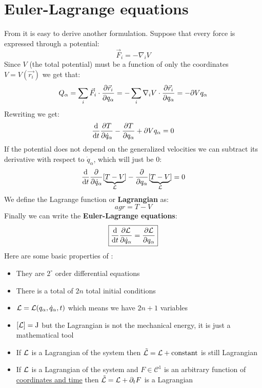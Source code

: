 \section{Euler-Lagrange equations}
From \lagrangeref\;it is easy to derive another formulation. Suppose that every force is expressed through a potential:
\begin{equation}
    \vec{F}_i = -\nabla_i V
\end{equation}
Since $V$ (the total potential) must be a function of only the coordinates $V = V(\vec{r_i})$ we get that:
\begin{equation}
    Q_{\alpha} = \displaystyle\sum_i \vec{F}_i \cdot \dfrac{\partial \vec{r}_i}{\partial q_{\alpha}} = - \displaystyle\sum_i \nabla_i V \cdot \dfrac{\partial \vec{r}_i}{\partial q_{\alpha}} = -\partial{V}{q_{\alpha}}
\end{equation}
Rewriting \lagrangeref\;we get:
\begin{equation}
    \dfrac{\mathrm{d} }{\mathrm{d}t}\dfrac{\partial T}{\partial \dot{q}_{\alpha}} - \dfrac{\partial T}{\partial q_{\alpha}} + \partial{V}{q_{\alpha}} = 0
\end{equation}
If the potential does not depend on the generalized velocities we can subtract its derivative with respect to $\dot{q}_{\alpha}$, which will just be 0:
\begin{equation}
    \dfrac{\mathrm{d} }{\mathrm{d}t}\dfrac{\partial }{\partial \dot{q}_{\alpha}}[\underbrace{T-V}_{\mathcal{L}} ] - \dfrac{\partial}{\partial q_{\alpha}}[\underbrace{T-V}_{\mathcal{L}} ] = 0
\end{equation}
We define the Lagrange function or \textbf{Lagrangian} as:
\begin{equation}
    agr  = T - V
\end{equation}
Finally we can write the \textbf{Euler-Lagrange equations}:
\begin{equation} \label{Euler_Lagrange_equations}
    \boxed{\dfrac{\mathrm{d} }{\mathrm{d}t}\dfrac{\partial \mathcal{L}}{\partial \dot{q}_{\alpha}} = \dfrac{\partial \mathcal{L}}{\partial q_{\alpha}}}
\end{equation}
Here are some basic properties of \eleref :
\begin{itemize}
    \item They are $2^\circ$ order differential equations
    \item There is a total of $2n$ total initial conditions
    \item $\mathcal{L} = \mathcal{L}(q_{\alpha},\dot{q}_{\alpha},t)$ which means we have $2n+1$ variables
    \item $[\mathcal{L}] = \mathrm{J}$ but the Lagrangian is not the mechanical energy, it is just a mathematical tool
    \item If $\mathcal{L}$ is a Lagrangian of the system then $\tilde{\mathcal{L}} = \mathcal{L} + \mathrm{constant}$ is still Lagrangian
    \item If $\mathcal{L}$ is a Lagrangian of the system and $F\in \mathcal{C}^1$ is an arbitrary function of \underline{coordinates and time} then $\tilde{\mathcal{L}} = \mathcal{L} + \partial_t F$ is a Lagrangian
\end{itemize}
